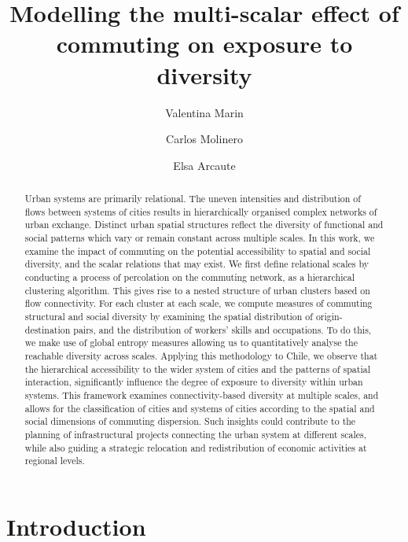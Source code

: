 \documentclass[11pt, a4paper]{article}
\title{Modelling the multi-scalar effect of commuting on exposure to diversity }
\author[1,*]{Valentina Marin}
\author[1]{Carlos Molinero}
\author[1]{Elsa Arcaute}
\affil[1]{Centre for Advanced Spatial Analysis (CASA) University College London, UK}
\affil[*]{corresponding author: v.marin@ucl.ac.uk}
\date{}
\begin{document}
\maketitle

\begin{abstract}

Urban systems are primarily relational. The uneven intensities and distribution of flows between systems of cities results in hierarchically organised complex networks of urban exchange. Distinct urban spatial structures reflect the diversity of functional and social patterns which vary or remain constant across multiple scales. In this work, we examine the impact of commuting on the potential accessibility to spatial and social diversity, and the scalar relations that may exist. We first define relational scales by conducting a process of percolation on the commuting network, as a hierarchical clustering algorithm. This gives rise to a nested structure of urban clusters based on flow connectivity. For each cluster at each scale, we compute measures of commuting structural and social diversity by examining the spatial distribution of origin-destination pairs, and the distribution of workers' skills and occupations. To do this, we make use of global entropy measures allowing us to quantitatively analyse the reachable diversity across scales. Applying this methodology to Chile, we observe that the hierarchical accessibility to the wider system of cities and the patterns of spatial interaction, significantly influence the degree of exposure to diversity within urban systems. This framework examines connectivity-based diversity at multiple scales, and allows for the classification of cities and systems of cities according to the spatial and social dimensions of commuting dispersion. Such insights could contribute to the planning of infrastructural projects connecting the urban system at different scales, while also guiding a strategic relocation and redistribution of economic activities at regional levels.


\end{abstract}




\section{Introduction}
\end{document}

